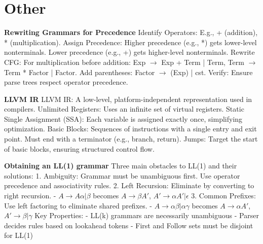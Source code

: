 \section{Other}

\textbf{Rewriting Grammars for Precedence}
Identify Operators: E.g., + (addition), * (multiplication).
Assign Precedence:
Higher precedence (e.g., *) gets lower-level nonterminals.
Lower precedence (e.g., +) gets higher-level nonterminals.
Rewrite CFG:
For multiplication before addition: Exp $\rightarrow$ Exp + Term | Term, Term $\rightarrow$ Term * Factor | Factor.
Add parentheses: Factor $\rightarrow$ (Exp) | cst.
Verify: Ensure parse trees respect operator precedence.


\textbf{LLVM IR}
LLVM IR: A low-level, platform-independent representation used in compilers.
Unlimited Registers: Uses an infinite set of virtual registers.
Static Single Assignment (SSA): Each variable is assigned exactly once, simplifying optimization.
Basic Blocks: Sequences of instructions with a single entry and exit point. Must end with a terminator (e.g., branch, return).
Jumps: Target the start of basic blocks, ensuring structured control flow.

\textbf{Obtaining an LL(1) grammar}
Three main obstacles to LL(1) and their solutions:
1. Ambiguity: Grammar must be unambiguous first. Use operator precedence and associativity rules.
2. Left Recursion: Eliminate by converting to right recursion.
   - $A \rightarrow A\alpha  | \beta $ becomes $A \rightarrow \beta A'$, $A' \rightarrow \alpha A' | \epsilon$
3. Common Prefixes: Use left factoring to eliminate shared prefixes.
   - $A \rightarrow \alpha \beta  | \alpha \gamma$ becomes $A \rightarrow \alpha A'$, $A' \rightarrow \beta  | \gamma$
Key Properties:
- LL(k) grammars are necessarily unambiguous
- Parser decides rules based on lookahead tokens
- First and Follow sets must be disjoint for LL(1)
